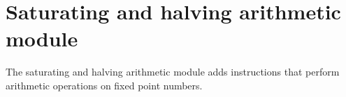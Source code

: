 %

\chapter{Saturating and halving arithmetic module}

The saturating and halving arithmetic module adds instructions that perform
arithmetic operations on fixed point numbers.

\tbd
